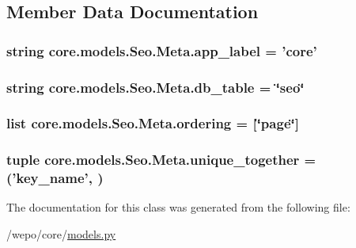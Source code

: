 \subsection{Member Data Documentation}
\hypertarget{classcore_1_1models_1_1Seo_1_1Meta_a8cd0ac3453f824e5d72581939b23e90d}{
\subsubsection[{app\-\_\-label}]{\setlength{\rightskip}{0pt plus 5cm}string core.\-models.\-Seo.\-Meta.\-app\-\_\-label = 'core'\hspace{0.3cm}{\ttfamily [static]}}}\label{classcore_1_1models_1_1Seo_1_1Meta_a8cd0ac3453f824e5d72581939b23e90d}
\hypertarget{classcore_1_1models_1_1Seo_1_1Meta_a6206feb5b4c17c296aea40c1605e8aa4}{
\subsubsection[{db\-\_\-table}]{\setlength{\rightskip}{0pt plus 5cm}string core.\-models.\-Seo.\-Meta.\-db\-\_\-table = \char`\"{}seo\char`\"{}\hspace{0.3cm}{\ttfamily [static]}}}\label{classcore_1_1models_1_1Seo_1_1Meta_a6206feb5b4c17c296aea40c1605e8aa4}
\hypertarget{classcore_1_1models_1_1Seo_1_1Meta_a5f2ba1b707cae6e343548641be5c1f74}{
\subsubsection[{ordering}]{\setlength{\rightskip}{0pt plus 5cm}list core.\-models.\-Seo.\-Meta.\-ordering = \mbox{[}\char`\"{}page\char`\"{}\mbox{]}\hspace{0.3cm}{\ttfamily [static]}}}\label{classcore_1_1models_1_1Seo_1_1Meta_a5f2ba1b707cae6e343548641be5c1f74}
\hypertarget{classcore_1_1models_1_1Seo_1_1Meta_a421bce50927c1396960f5f9283e32ff6}{
\subsubsection[{unique\-\_\-together}]{\setlength{\rightskip}{0pt plus 5cm}tuple core.\-models.\-Seo.\-Meta.\-unique\-\_\-together = ('{\bf key\-\_\-name}', )\hspace{0.3cm}{\ttfamily [static]}}}\label{classcore_1_1models_1_1Seo_1_1Meta_a421bce50927c1396960f5f9283e32ff6}


The documentation for this class was generated from the following file\-:\begin{DoxyCompactItemize}
\item 
/wepo/core/\hyperlink{models_8py}{models.\-py}\end{DoxyCompactItemize}
